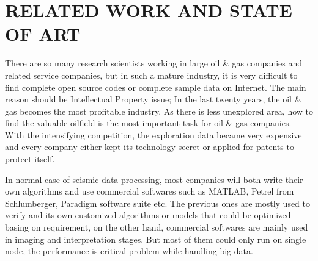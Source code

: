 %
%
%

\chapter{\uppercase{Related Work and State of Art}}

There are so many research scientists working in large oil \& gas companies and related service companies, but in such a mature industry, it is very difficult to find complete open source codes or complete sample data on Internet. The main reason should be Intellectual Property issue; In the last twenty years, the oil \& gas becomes the most profitable industry. As there is less unexplored area, how to find the valuable oilfield is the most important task for oil \& gas companies. With the intensifying competition, the exploration data became very expensive and every company either kept its technology secret or applied for patents to protect itself.    

In normal case of seismic data processing, most companies will both write their own algorithms and use commercial softwares such as MATLAB, Petrel from Schlumberger, Paradigm software suite etc. The previous ones are mostly used to verify and its own customized algorithms or models that could be optimized basing on requirement, on the other hand, commercial softwares are mainly used in imaging and interpretation stages. But most of them could only run on single node, the performance is critical problem while handling big data.  

